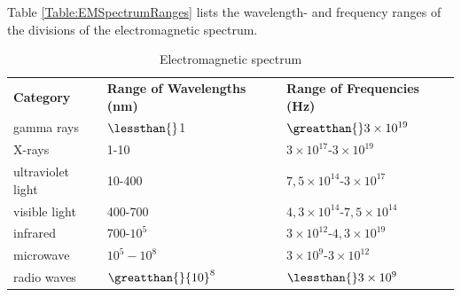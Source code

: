       \label{m38778*id187332}Table \ref{Table:EMSpectrumRanges} lists the wavelength- and frequency ranges of the divisions of the electromagnetic spectrum.\par 
          \begin{table}[H]
        \begin{center}
      \label{m38778*uid8}
    \noindent
    
      \begin{tabular}[t]{|l|l|l|}\hline
                \textbf{Category}
               &
                \textbf{Range of Wavelengths (nm)}
               &
                \textbf{Range of Frequencies (Hz)}
     \tabularnewline\cline{1-1}\cline{2-2}\cline{3-3}
        gamma rays &
        $\lessthan{}$1 &
                $\greatthan{}3\ensuremath{\times}{10}^{19}$
     \tabularnewline\cline{1-1}\cline{2-2}\cline{3-3}
        X-rays &
        1-10 &
        $3\ensuremath{\times}{10}^{17}$-$3\ensuremath{\times}{10}^{19}$%
     \tabularnewline\cline{1-1}\cline{2-2}\cline{3-3}
        ultraviolet light &
        10-400 &
        $7,5\ensuremath{\times}{10}^{14}$-$3\ensuremath{\times}{10}^{17}$%
     \tabularnewline\cline{1-1}\cline{2-2}\cline{3-3}
        visible light &
        400-700 &
        $4,3\ensuremath{\times}{10}^{14}$-$7,5\ensuremath{\times}{10}^{14}$%
     \tabularnewline\cline{1-1}\cline{2-2}\cline{3-3}
        infrared &
        700-${10}^{5}$ &
        $3\ensuremath{\times}{10}^{12}$-$4,3\ensuremath{\times}{10}^{19}$%
     \tabularnewline\cline{1-1}\cline{2-2}\cline{3-3}
        microwave &
                ${10}^{5}-{10}^{8}$
               &
        $3\ensuremath{\times}{10}^{9}$-$3\ensuremath{\times}{10}^{12}$%
     \tabularnewline\cline{1-1}\cline{2-2}\cline{3-3}
        radio waves &
                $\greatthan{}{10}^{8}$
               &
                $\lessthan{}3\ensuremath{\times}{10}^{9}$
     \tabularnewline\cline{1-1}\cline{2-2}\cline{3-3}
    \end{tabular}
      \end{center}
    \label{table:EMSpectrumRanges}
    \caption{Electromagnetic spectrum}
\end{table}
